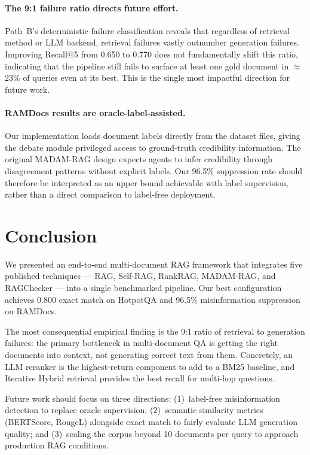 \documentclass{article}
\begin{document}
\paragraph{The 9:1 failure ratio directs future effort.}
Path~B's deterministic failure classification reveals that regardless
of retrieval method or LLM backend, retrieval failures vastly
outnumber generation failures.  Improving Recall@5 from 0.650 to
0.770 does not fundamentally shift this ratio, indicating that the
pipeline still fails to surface at least one gold document in
$\approx$23\% of queries even at its best.  This is the single most
impactful direction for future work.

\paragraph{RAMDocs results are oracle-label-assisted.}
Our implementation loads document labels directly from the dataset
files, giving the debate module privileged access to ground-truth
credibility information.  The original MADAM-RAG design expects
agents to infer credibility through disagreement patterns without
explicit labels.  Our 96.5\% suppression rate should therefore be
interpreted as an upper bound achievable with label supervision,
rather than a direct comparison to label-free deployment.

\section{Conclusion}
\label{sec:conclusion}

We presented an end-to-end multi-document RAG framework that
integrates five published techniques — RAG, Self-RAG, RankRAG,
MADAM-RAG, and RAGChecker — into a single benchmarked pipeline.
Our best configuration achieves 0.800 exact match on HotpotQA
and 96.5\% misinformation suppression on RAMDocs.

The most consequential empirical finding is the 9:1 ratio of
retrieval to generation failures: the primary bottleneck in
multi-document QA is getting the right documents into context,
not generating correct text from them.  Concretely, an LLM reranker
is the highest-return component to add to a BM25 baseline, and
Iterative Hybrid retrieval provides the best recall for multi-hop
questions.

Future work should focus on three directions: (1)~label-free
misinformation detection to replace oracle supervision; (2)~semantic
similarity metrics (BERTScore, RougeL) alongside exact match to
fairly evaluate LLM generation quality; and (3)~scaling the corpus
beyond 10 documents per query to approach production RAG conditions.
\end{document}
